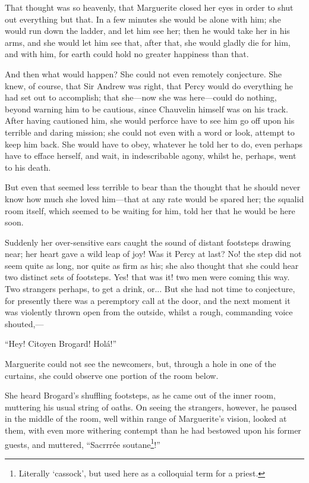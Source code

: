 That thought was so heavenly, that Marguerite closed her eyes in order to shut out everything but that. In a few minutes she would be alone with him; she would run down the ladder, and let him see her; then he would take her in his arms, and she would let him see that, after that, she would gladly die for him, and with him, for earth could hold no greater happiness than that.

And then what would happen? She could not even remotely conjecture. She knew, of course, that Sir Andrew was right, that Percy would do everything he had set out to accomplish; that she---now she was here---could do nothing, beyond warning him to be cautious, since Chauvelin himself was on his track. After having cautioned him, she would perforce have to see him go off upon his terrible and daring mission; she could not even with a word or look, attempt to keep him back. She would have to obey, whatever he told her to do, even perhaps have to efface herself, and wait, in indescribable agony, whilst he, perhaps, went to his death.

But even that seemed less terrible to bear than the thought that he should never know how much she loved him---that at any rate would be spared her; the squalid room itself, which seemed to be waiting for him, told her that he would be here soon.

Suddenly her over-sensitive ears caught the sound of distant footsteps drawing near; her heart gave a wild leap of joy! Was it Percy at last? No! the step did not seem quite as long, nor quite as firm as his; she also thought that she could hear two distinct sets of footsteps. Yes! that was it! two men were coming this way. Two strangers perhaps, to get a drink, or... But she had not time to conjecture, for presently there was a peremptory call at the door, and the next moment it was violently thrown open from the outside, whilst a rough, commanding voice shouted,---

\enquote{Hey! Citoyen Brogard! Holá!}

Marguerite could not see the newcomers, but, through a hole in one of the curtains, she could observe one portion of the room below.

She heard Brogard's shuffling footsteps, as he came out of the inner room, muttering his usual string of oaths. On seeing the strangers, however, he paused in the middle of the room, well within range of Marguerite's vision, looked at them, with even more withering contempt than he had bestowed upon his former guests, and muttered, \enquote{Sacrrrée soutane\footnote{Literally \enquote{cassock}, but used here as a colloquial term for a priest.}!}

